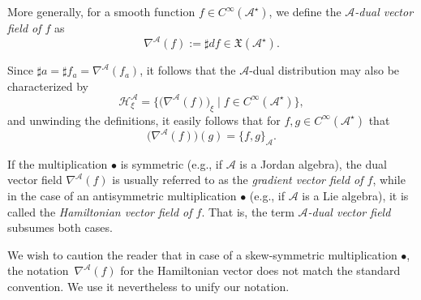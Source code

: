 \documentclass[pdftex]{sigma}
\numberwithin{equation}{section}
\newcommand{\be}{\begin{equation}}
\newcommand{\ee}{\end{equation}}
\newcommand{\lra}{\longrightarrow}
\newcommand{\hh}{\mathcal{H}}
\newcommand{\dcal}{\mathcal{D}}
\newcommand{\m}{\mathfrak{m}}
\newcommand{\G}{\mathrm{G}}
\newcommand{\Gl}{{\mathrm{Gl}}}
\renewcommand{\m}{{\mathfrak m}}
\newcommand{\gl}{{\mathfrak{gl}}}
\newcommand{\cA}{\mathcal{A}}
\begin{document}
More generally, for a smooth function $f \in C^\infty(\cA^\star)$, we define the {\em $\cA$-dual vector field of $f$} as
\be \label{eq:grad-A}
\nabla^{\cA}(f) := \sharp df \in \mathfrak{X}(\cA^\star).
\ee

Since $\sharp a = \sharp f_a = \nabla^\cA(f_a)$, it follows that the $\cA$-dual distribution may also be characterized by
\[%
\hh^\cA_\xi = \big\{ \big(\nabla^\cA(f)\big)_\xi \mid f \in C^\infty(\cA^\star)\big\},
\]
and unwinding the definitions, it easily follows that for $f, g \in C^\infty(\cA^\star)$ that
\[%
\big(\nabla^\cA(f)\big)(g) = \{f, g\}_\cA.
\]

\begin{Remark} If the multiplication $\bullet$ is symmetric (e.g., if $\cA$ is a Jordan algebra), the dual vector field $\nabla^\cA(f)$ is usually referred to as the {\em gradient vector field of $f$}, while in the case of an antisymmetric multiplication $\bullet$ (e.g., if $\cA$ is a Lie algebra), it is called the {\em Hamiltonian vector field of $f$}. That is, the term {\em $\cA$-dual vector field }subsumes both cases.

We wish to caution the reader that in case of a skew-symmetric multiplication $\bullet$, the notation~$\nabla^{\cA}(f)$ for the Hamiltonian vector does not match the standard convention. We use it nevertheless to unify our notation.
\end{Remark}

%
\end{document}
